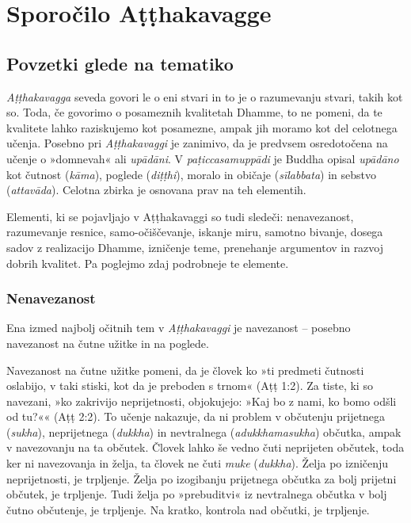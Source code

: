 \chapter{Sporočilo Aṭṭhakavagge}

\section{Povzetki glede na tematiko}

\emph{Aṭṭhakavagga} seveda govori le o eni stvari in to je o razumevanju
stvari, takih kot so. Toda, če govorimo o posameznih kvalitetah Dhamme,
to ne pomeni, da te kvalitete lahko raziskujemo kot posamezne, ampak jih
moramo kot del celotnega učenja. Posebno pri \emph{Aṭṭhakavaggi} je
zanimivo, da je predvsem osredotočena na učenje o »domnevah« ali
\emph{upādāni}. V \emph{paṭiccasamuppādi} je Buddha opisal
\emph{upādāno} kot čutnost (\emph{kāma}), poglede (\emph{diṭṭhi}),
moralo in običaje (\emph{sīlabbata}) in sebstvo (\emph{attavāda}).
Celotna zbirka je osnovana prav na teh elementih.

Elementi, ki se pojavljajo v Aṭṭhakavaggi so tudi sledeči:
nenavezanost, razumevanje resnice, samo-očiščevanje, iskanje miru,
samotno bivanje, dosega sadov z realizacijo Dhamme, izničenje teme,
prenehanje argumentov in razvoj dobrih kvalitet. Pa poglejmo zdaj
podrobneje te elemente.

\clearpage

\subsection{Nenavezanost}

Ena izmed najbolj očitnih tem v
\emph{Aṭṭhakavaggi} je navezanost -- posebno navezanost na čutne užitke
in na poglede.

Navezanost na čutne užitke pomeni, da je človek ko »ti predmeti
čutnosti oslabijo, v taki stiski, kot da je preboden s trnom« (Aṭṭ 1:2).
Za tiste, ki so navezani, »ko zakrivijo neprijetnosti, objokujejo: »Kaj
bo z nami, ko bomo odšli od tu?«« (Aṭṭ 2:2). To učenje nakazuje, da ni
problem v občutenju prijetnega (\emph{sukha}), neprijetnega
(\emph{dukkha}) in nevtralnega (\emph{adukkhamasukha}) občutka, ampak v
navezovanju na ta občutek. Človek lahko še vedno čuti neprijeten
občutek, toda ker ni navezovanja in želja, ta človek ne čuti \emph{muke}
(\emph{dukkha}). Želja po izničenju neprijetnosti, je trpljenje. Želja
po izogibanju prijetnega občutka za bolj prijetni občutek, je trpljenje.
Tudi želja po »prebuditvi« iz nevtralnega občutka v bolj čutno
občutenje, je trpljenje. Na kratko, kontrola nad občutki, je trpljenje.

